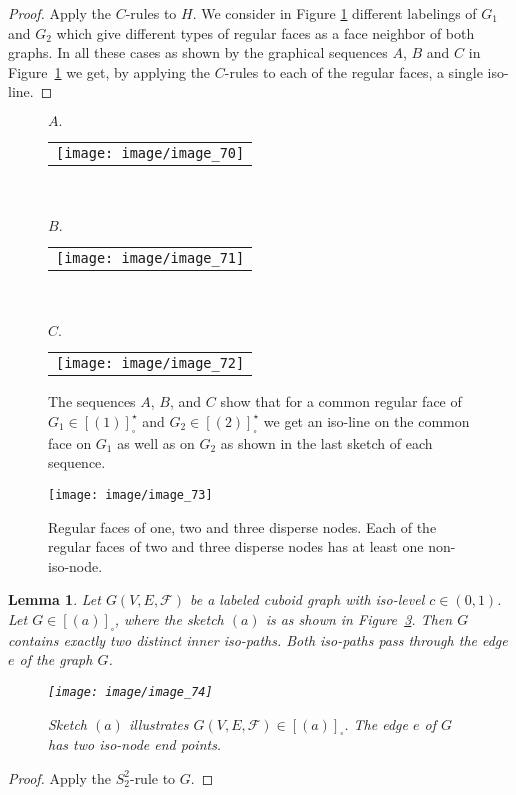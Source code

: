 \documentclass[a4paper,11pt]{article}
\newtheorem{lemma}[theorem]{Lemma}
\begin{document}
\begin{proof} Apply the $C$-rules to $H$. We consider in Figure \ref{image_70_71_72} different
labelings of $G_1$ and $G_2$ which give different types of regular faces as a face neighbor
of both graphs. In all these cases as shown by the graphical sequences $A$, $B$ and $C$ in
Figure~\ref{image_70_71_72} we get, by applying the $C$-rules to each of the regular faces,
a single iso-line.
\end{proof}
\begin{figure}[!ht]
\noindent $A.$
\begin{tabular}[c]{l}
\texttt{[image: image/image\_70]}
\end{tabular}
\\ \\

\noindent $B.$
\begin{tabular}[c]{l}
\texttt{[image: image/image\_71]}
\end{tabular}
\\ \\

\noindent $C.$
\begin{tabular}[c]{l}
\texttt{[image: image/image\_72]}
\end{tabular}
\caption{The sequences $A$, $B$, and $C$ show that for a common regular face of
$G_1\in [(1)]_{\square}^{\star}$ and $G_2\in [(2)]_{\square}^{\star}$ we get an iso-line
on the common face on $G_1$ as well as on $G_2$ as shown in the last sketch of each sequence.}
\label{image_70_71_72}
\end{figure}
\begin{figure}[!ht]
\texttt{[image: image/image\_73]}
\caption{Regular faces of one, two and three disperse nodes. Each of the regular faces of
two and three disperse nodes has at least one non-iso-node.}
\label{image_73}
\end{figure}
\FloatBarrier

\begin{lemma}\label{lemma:connect-2}
Let $G(V,E,\mathcal{F})$ be a labeled cuboid graph with iso-level $c\in (0,1)$. Let $G\in [(a)]_{\square}$,
where the sketch $(a)$ is as shown in Figure~\ref{image_74}. Then $G$ contains exactly two distinct
inner iso-paths. Both iso-paths pass through the edge $e$ of the graph $G$.
\begin{figure}[!ht]
\texttt{[image: image/image\_74]}
\caption{Sketch $(a)$ illustrates $G(V,E,\mathcal{F})\in [(a)]_{\square}$. The edge $e$ of $G$ has
two iso-node end points.}
\label{image_74}
\end{figure}
\FloatBarrier
\end{lemma}
\begin{proof}
Apply the $S_2^2$-rule to $G$.
\end{proof}
\end{document}
